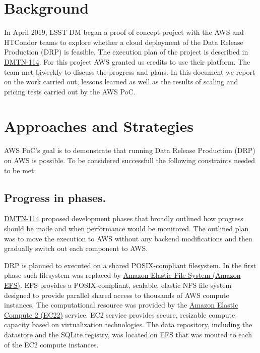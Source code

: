 \newcommand{\poc}{AWS PoC}
\newcommand{\dmtn}[1]{\href{https://dmtn-#1.lsst.io}{DMTN-#1}}


\section{Background}

In April 2019, LSST DM began a proof of concept project with the AWS and HTCondor teams to explore whether a cloud deployment of the Data Release Production (DRP) is feasible.
The execution plan of the project is described in \dmtn{114}.
For this project AWS granted us credits to use their platform.
The team met biweekly to discuss the progress and plans.
In this document we report on the work carried out, lessons learned as well as the results of scaling and pricing tests carried out by the \poc.


\section{Approaches and Strategies}

\poc's goal is to demonstrate that running Data Release Production (DRP) on AWS is possible. To be considered successfull the following constraints needed to be met:

\subsection{Progress in phases.}

\dmtn{114} proposed development phases that broadly outlined how progress should be made and when performance would be monitored. The outlined plan was to move the execution to AWS without any backend modifications and then gradually switch out each component to AWS.

DRP is planned to executed on a shared POSIX-compliant filesystem. In the first phase such filesystem was replaced by \href{https://aws.amazon.com/efs/}{Amazon Elastic File System (Amazon EFS)}. EFS provides a POSIX-compliant, scalable, elastic NFS file system designed to provide parallel shared access to thousands of AWS compute instances. The computational resource was provided by the \href{https://aws.amazon.com/ec2/}{Amazon Elastic Compute 2 (EC22)} service. EC2 service provides secure, resizable compute capacity based on virtualization technologies. The data repository, including the datastore and the SQLite registry, was located on EFS that was mouted to each of the EC2 compute instances.


